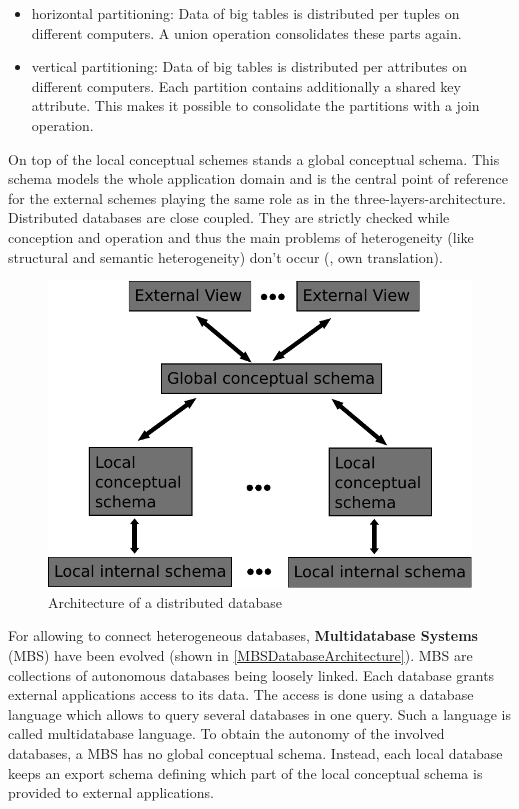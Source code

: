 \begin{itemize}
\item horizontal partitioning: Data of big tables is distributed per tuples on different computers. A union operation consolidates these parts again.
\item vertical partitioning: Data of big tables is distributed per attributes on different computers. Each partition contains additionally a shared key attribute. This makes it possible to consolidate the partitions with a join operation.
\end{itemize}
On top of the local conceptual schemes stands a global conceptual schema. This schema models the whole application domain and is the central point of reference for the external schemes playing the same role as in the three-layers-architecture.
Distributed databases are close coupled. They are strictly checked while conception and operation and thus the main problems of heterogeneity (like structural and semantic heterogeneity) don't occur (\cite[p. 91-93]{DBLP:books/dp/LeserN2006}, own translation).
\begin{figure}[H]
	\begin{center}
		\includegraphics[scale=0.5]{figures/distributedDatabaseArchitecture.pdf}
	\end{center}
	\caption{Architecture of a distributed database}
	\label{DistributedDatabaseArchitecture}
\end{figure}
For allowing to connect heterogeneous databases, \textbf{Multidatabase Systems} (MBS) have been evolved (shown in \ref{MBSDatabaseArchitecture}). MBS are collections of autonomous databases being loosely linked. Each database grants external applications access to its data. The access is done using a database language which allows to query several databases in one query. Such a language is called multidatabase language. To obtain the autonomy  of the involved databases, a MBS has no global conceptual schema. Instead, each local database keeps an export schema defining which part of the local conceptual schema is provided to external applications.  
